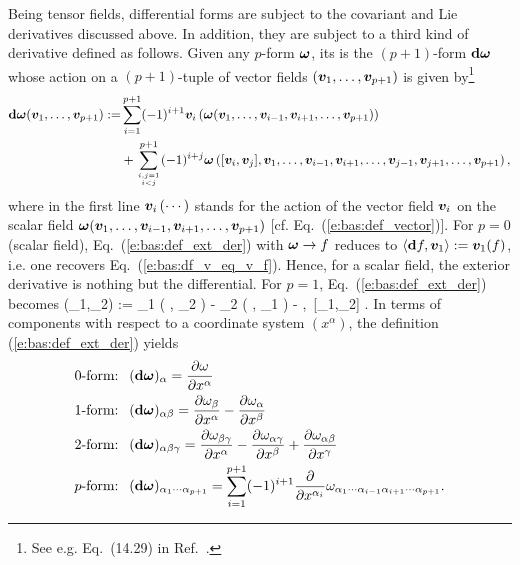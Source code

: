 Being tensor fields, differential forms are subject to the covariant
and Lie derivatives discussed above. In addition, they are subject to a third kind
of derivative defined as follows.  Given any $p$-form $\bm{\omega}$,
its 
is the $(p+1)$-form $\mathbf{d}\bm{\omega}$
whose action on a $(p+1)$-tuple of vector fields $(\bm{v}_1,\ldots,\bm{v}_{p+1})$
is given by\footnote{See e.g. Eq.~(14.29) in Ref.~\cite{Lee13}.}
\begin{align}
\mathbf{d}\bm{\omega}(\bm{v}_1,\ldots,\bm{v}_{p+1}) := & \sum_{i=1}^{p+1} (-1)^{i+1}
    \bm{v}_i\left(\bm{\omega}(\bm{v}_1,\ldots,\bm{v}_{i-1},\bm{v}_{i+1},\ldots,\bm{v}_{p+1})\right) \nonumber \\
    & + \sum_{i,j=1\atop i < j}^{p+1}
    (-1)^{i+j} \bm{\omega}\left([\bm{v}_i,\bm{v}_j],\bm{v}_1,\ldots,\bm{v}_{i-1},\bm{v}_{i+1},
        \ldots,\bm{v}_{j-1},\bm{v}_{j+1},\ldots,\bm{v}_{p+1}\right) , \label{e:bas:def_ext_der}
\end{align}
where in the first line $\bm{v}_i\left(\cdots\right)$ stands for the action of the vector field
$\bm{v}_i$ on the scalar field $\bm{\omega}(\bm{v}_1,\ldots,\bm{v}_{i-1},\bm{v}_{i+1},\ldots,\bm{v}_{p+1})$
[cf. Eq.~(\ref{e:bas:def_vector})].
For $p=0$ (scalar field), Eq.~(\ref{e:bas:def_ext_der}) with $\bm{\omega}\to f$  reduces
to $\langle \mathbf{d} f, \bm{v}_1 \rangle := \bm{v}_1(f)$, i.e. one recovers Eq.~(\ref{e:bas:df_v_eq_v_f}). Hence, for a
scalar field, the exterior derivative is nothing but the differential. For $p=1$, Eq.~(\ref{e:bas:def_ext_der})
becomes
\be \label{e:bas:def_ext_der_p1}
    \dd\w{\omega}(_1,_2) := _1 \left( \langle \w{\omega}, _2 \rangle \right)
        - _2 \left( \langle \w{\omega}, _1 \rangle \right)
        - \left\langle \w{\omega},\, [_1,_2] \right\rangle .
\ee
In terms of components with respect to a coordinate system $(x^\alpha)$,
the definition (\ref{e:bas:def_ext_der}) yields
\begin{subequations}
\label{e:bas:def_der_ext_comp}
\begin{align}
    \mbox{0-form: \ }  & (\mathbf{d}\bm{\omega})_\alpha =
        \frac{\partial \omega}{\partial x^\alpha} \label{e:bas:def_ext_0f} \\
    \mbox{1-form: \ }  & (\mathbf{d}\bm{\omega})_{\alpha\beta} =
    \frac{\partial \omega_\beta}{\partial x^\alpha} - \frac{\partial \omega_\alpha}{\partial x^\beta}
             \label{e:bas:def_ext_1f} \\
    \mbox{2-form: \ }  & (\mathbf{d}\bm{\omega})_{\alpha\beta\gamma} =
    \frac{\partial \omega_{\beta\gamma}}{\partial x^\alpha} -
    \frac{\partial \omega_{\alpha\gamma}}{\partial x^\beta} +
    \frac{\partial \omega_{\alpha\beta}}{\partial x^\gamma} \label{e:bas:def_ext_2f} \\
     \mbox{$p$-form: \ }  &
     (\mathbf{d}\bm{\omega})_{\alpha_1\cdots\alpha_{p+1}} =
     \sum_{i=1}^{p+1} (-1)^{i+1} \frac{\partial }{\partial x^{\alpha_i}}
     \omega_{\alpha_1\cdots\alpha_{i-1}\alpha_{i+1}\cdots\alpha_{p+1}} .
\end{align}
\end{subequations}

